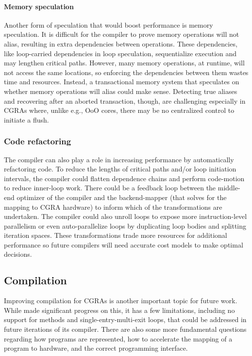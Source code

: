 \paragraph{Memory speculation}
Another form of speculation that would boost performance is memory speculation.
% 
% 
It is difficult for the compiler to prove memory operations will not alias, resulting in extra dependencies between operations.
% 
These dependencies, like loop-carried dependencies in loop speculation, sequentialize execution and may lengthen critical paths.
% 
However, many memory operations, at runtime, will not access the same locations,  so enforcing the dependencies between them wastes time and resources.
% 
Instead, a transactional memory system that speculates on whether memory operations will alias could make sense.
% 
Detecting true aliases and recovering after an aborted transaction, though, are challenging especially in CGRAs where, unlike e.g., OoO cores, there may be no centralized control to initiate a flush.

\subsubsection{Code refactoring}
The compiler can also play a role in increasing performance by automatically refactoring code.
%
To reduce the lengths of critical paths and/or loop initiation intervals, the compiler could flatten dependence chains and perform code-motion to reduce inner-loop work.
% 
There could be a feedback loop between the middle-end optimizer of the compiler and the backend-mapper (that solves for the mapping to CGRA hardware) to inform which of the transformations are undertaken.
% 
The compiler could also unroll loops to expose more instruction-level parallelism or even auto-parallelize loops by duplicating loop bodies and splitting iteration spaces.
% 
These transformations trade more resources for additional performance so future compilers will need accurate cost models to make optimal decisions.

\subsection{Compilation}
Improving compilation for CGRAs is another important topic for future work.
% 
While \riptide made significant progress on this, it has a few limitations, including no support for methods and single-entry-multi-exit loops, that could be addressed in future iterations of its compiler.
% 
There are also some more fundamental questions regarding how programs are represented, how to accelerate the mapping of a program to hardware, and the correct programming interface.

